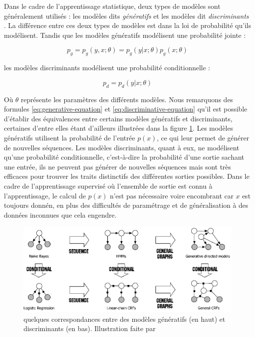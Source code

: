 \documentclass[PhD-Yoann-Dupont.tex]{subfiles}
\begin{document}
Dans le cadre de l'apprentissage statistique, deux types de modèles sont généralement utilisés : les modèles dits \emph{génératifs} et les modèles dit \emph{discriminants} \citep{ng2002discriminative}. La différence entre ces deux types de modèles est dans la loi de probabilité qu'ils modélisent. Tandis que les modèles génératifs modélisent une probabilité jointe :

\begin{equation}\label{eq:generative-equation}
p_{g} = p_{g}(y,x;\theta) = p_{g}(y|x;\theta)p_{g}(x;\theta)
\end{equation}

les modèles discriminants modélisent une probabilité conditionnelle :

\begin{equation}\label{eq:discriminative-equation}
p_{d} = p_{d}(y|x;\theta)
\end{equation}

Où $\theta$ représente les paramètres des différents modèles. Nous remarquons des formules \ref{eq:generative-equation} et \ref{eq:discriminative-equation} qu'il est possible d'établir des équivalences entre certains modèles génératifs et discriminants, certaines d'entre elles étant d'ailleurs illustrées dans la figure \ref{fig:generative-vs-discriminative}. Les modèles génératifs utilisent la probabilité de l'entrée $p(x)$, ce qui leur permet de générer de nouvelles séquences. Les modèles discriminants, quant à eux, ne modélisent qu'une probabilité conditionnelle, c'est-à-dire la probabilité d'une sortie sachant une entrée, ils ne peuvent pas générer de nouvelles séquences mais sont très efficaces pour trouver les traits distinctifs des différentes sorties possibles. Dans le cadre de l'apprentissage supervisé où l'ensemble de sortie est connu à l'apprentissage, le calcul de $p(x)$ n'est pas nécessaire voire encombrant car $x$ est toujours donnén, en plus des difficultés de paramétrage et de généralisation à des données inconnues que cela engendre.

\begin{figure}[ht!]
\centering
\includegraphics[scale=1.2]{images/general/generative-vs-discriminative}
\caption{quelques correspondances entre des modèles génératifs (en haut) et discriminants (en bas). Illustration faite par \citet{sutton2010introduction}}
\label{fig:generative-vs-discriminative}
\end{figure}
\end{document}
